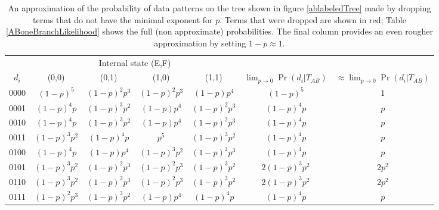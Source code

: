 \documentclass[11pt]{article}
\begin{document}
\begin{table}[htdp]
\begin{center}
\caption{An approximation of the probability of data patterns on the tree shown in figure \ref{ablabeledTree} made
by dropping terms that do not have the minimal exponent for $p$.
Terms that were dropped are shown in red; Table \ref{ABoneBranchLikelihood} shows the full (non approximate) probabilities.
The final column provides an even rougher approximation by setting $1-p\approx 1$.
}\label{lowPLikelihoods}
\begin{tabular}{|c|c|c|c|c|c|c|}
\hline 
             & \multicolumn{4}{c|}{Internal state (E,F)} &  & \\ 
$d_i$ & (0,0) & (0,1) & (1,0) & (1,1) &  $\lim_{p\rightarrow 0}\Pr(d_i|T_{AB})$ & $\approx \lim_{p\rightarrow 0}\Pr(d_i|T_{AB})$ \\ 
\hline
0000  & {\color{black}$(1-p)^5 $ } & {\color{red}$(1-p)^2 p^3 $ } & {\color{red}$(1-p)^2 p^3 $ } & {\color{red}$(1-p) p^4 $  }      & $(1-p)^5$ & $1$ \\
0001  & {\color{black}$(1-p)^4 p $ } & {\color{red}$(1-p)^3 p^2 $ } & {\color{red}$(1-p) p^4 $ } & {\color{red}$(1-p)^2 p^3 $ }     & $(1-p)^4 p$  & $p$ \\
0010  & {\color{black}$(1-p)^4 p $ } & {\color{red}$(1-p)^3 p^2 $ } & {\color{red}$(1-p) p^4 $ } & {\color{red}$(1-p)^2 p^3 $ }     & $(1-p)^4 p$ & $p$ \\
0011  & {\color{red}$(1-p)^3 p^2 $ } & {\color{black}$(1-p)^4 p $ } & {\color{red}$p^5 $ } & {\color{red}$(1-p)^3 p^2 $ }           & $(1-p)^4 p$ & $p$ \\
0100  & {\color{black}$(1-p)^4 p $ } & {\color{red}$(1-p) p^4 $ } & {\color{red}$(1-p)^3 p^2 $ } & {\color{red}$(1-p)^2 p^3 $ }     & $(1-p)^4 p$ & $p$ \\
0101  & {\color{black}$(1-p)^3 p^2 $ } & {\color{red}$(1-p)^2 p^3 $ } & {\color{red}$(1-p)^2 p^3 $ } & {\color{black}$(1-p)^3 p^2 $ } & $2 (1-p)^3 p^2$ & $2p^2$ \\
0110  & {\color{black}$(1-p)^3 p^2 $ } & {\color{red}$(1-p)^2 p^3 $ } & {\color{red}$(1-p)^2 p^3 $ } & {\color{black}$(1-p)^3 p^2 $ } & $2 (1-p)^3 p^2$ & $2p^2$ \\
0111  & {\color{red}$(1-p)^2 p^3 $ } & {\color{red}$(1-p)^3 p^2 $ } & {\color{red}$(1-p) p^4 $ } & {\color{black}$(1-p)^4 p $ }     & $(1-p)^4 p$ & $p$ \\
\hline
\end{tabular}
\end{center}
\end{table}
\end{document}
